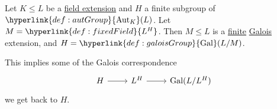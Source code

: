 \documentclass{article}
\DeclareMathOperator{\Aut}{Aut}
\DeclareMathOperator{\Gal}{Gal}
\begin{document}

\begin{nthm}\label{thm:3.3}
    Let $K \leq L$ be a \hyperlink{def:fieldExt}{field extension} and $H$ a finite subgroup of $\hyperlink{def:autGroup}{\Aut_K}(L)$.
    Let $M = \hyperlink{def:fixedField}{L^H}$.
    Then $M \leq L$ is a \hyperlink{def:degreeOfFieldExt}{finite} \hyperlink{def:galoisExt}{Galois} extension, and $H = \hyperlink{def:galoisGroup}{\Gal}(L/M)$.
\end{nthm}

\begin{remark}
    This implies some of the Galois correspondence
    \begin{equation*}
        \begin{tikzcd}
            H \arrow[r] & L^H \arrow[r] & \Gal(L / L^H)
        \end{tikzcd}
    \end{equation*}
    we get back to $H$.
\end{remark}
\end{document}
